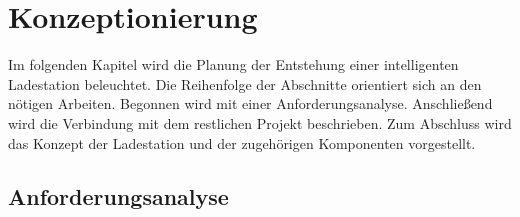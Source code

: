 
\chapter{Konzeptionierung} 
\label{ch:Konzeptionierung}

Im folgenden Kapitel wird die Planung der Entstehung einer intelligenten Ladestation beleuchtet.
Die Reihenfolge der Abschnitte orientiert sich an den nötigen Arbeiten. Begonnen wird mit einer Anforderungsanalyse. Anschließend wird die Verbindung mit dem restlichen Projekt beschrieben. Zum Abschluss wird das Konzept der Ladestation und der zugehörigen Komponenten vorgestellt.

\section{Anforderungsanalyse}
\label{sec:Anforderungsanalyse}